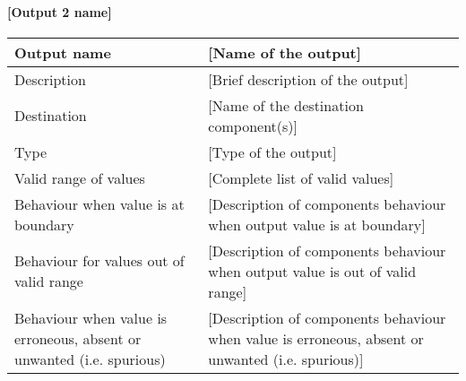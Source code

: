 \paragraph{[Output 2 name]}

\begin{longtable}{p{}p{}}
\toprule
Output name				& [Name of the output] \\
\midrule
Description				& [Brief description of the output] \\
\midrule
Destination				& [Name of the destination component(s)] \\ 
\midrule
Type					& [Type of the output] \\
\midrule
Valid range of values	& [Complete list of valid values] \\
\midrule
Behaviour when value is at boundary	& [Description of components behaviour when output value is at boundary] \\
\midrule
Behaviour for values out of valid range	& [Description of components behaviour when output value is out of valid range] \\
\midrule
Behaviour when value is erroneous, absent or unwanted (i.e. spurious) & [Description of components behaviour when value is erroneous, absent or unwanted (i.e. spurious)] \\
\bottomrule
\end{longtable}
